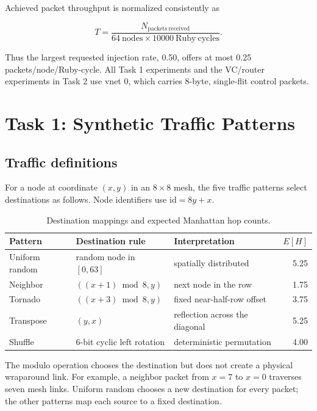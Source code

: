 \documentclass[11pt,a4paper]{article}
\begin{document}
Achieved packet throughput is normalized consistently as

\begin{equation}
T=\frac{N_{\mathrm{packets\ received}}}
        {64\ \mathrm{nodes}\times10000\ \mathrm{Ruby\ cycles}}.
\end{equation}

Thus the largest requested injection rate, 0.50, offers at most 0.25
packets/node/Ruby-cycle. All Task 1 experiments and the VC/router experiments
in Task 2 use vnet 0, which carries 8-byte, single-flit control packets.

\section{Task 1: Synthetic Traffic Patterns}

\subsection{Traffic definitions}

For a node at coordinate $(x,y)$ in an $8\times8$ mesh, the five traffic
patterns select destinations as follows. Node identifiers use
$\mathrm{id}=8y+x$.

\begin{table}[H]
\centering
\small
\caption{Destination mappings and expected Manhattan hop counts.}
\begin{tabular}{lll r}
\toprule
Pattern & Destination rule & Interpretation & $E[H]$ \\
\midrule
Uniform random & random node in $[0,63]$ & spatially distributed & 5.25 \\
Neighbor & $((x+1)\bmod8,y)$ & next node in the row & 1.75 \\
Tornado & $((x+3)\bmod8,y)$ & fixed near-half-row offset & 3.75 \\
Transpose & $(y,x)$ & reflection across the diagonal & 5.25 \\
Shuffle & 6-bit cyclic left rotation & deterministic permutation & 4.00 \\
\bottomrule
\end{tabular}
\end{table}

The modulo operation chooses the destination but does not create a physical
wraparound link. For example, a neighbor packet from $x=7$ to $x=0$ traverses
seven mesh links. Uniform random chooses a new destination for every packet;
the other patterns map each source to a fixed destination.
\end{document}
